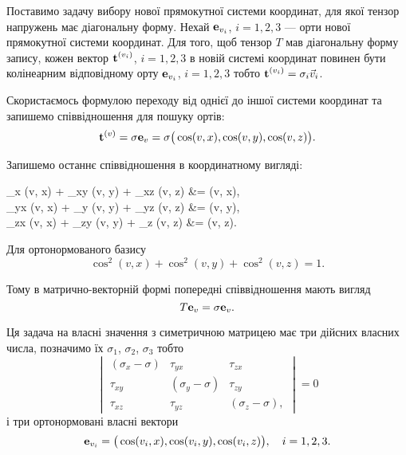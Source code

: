 Поставимо задачу вибору нової прямокутної системи координат, для якої тензор напружень має діагональну форму. Нехай $\bf{e}_{v_i}$, $i = 1, 2, 3$ --- орти нової прямокутної системи координат. Для того, щоб тензор $T$ мав діагональну форму запису, кожен вектор $\bf{t}^{(v_i)}$, $i = 1, 2, 3$ в новій системі координат повинен бути колінеарним відповідному орту $\bf{e}_{v_i}$, $i = 1, 2, 3$ тобто $\bf{t}^{(v_i)} = \sigma_i \vec v_i$. \medskip

Скористаємось формулою переходу від однієї до іншої системи координат та запишемо співвідношення для пошуку ортів:
\begin{equation}
	\bf{t}^{(v)} = \sigma \bf{e}_v = \sigma \big( \cos(v, x), \cos (v, y), \cos (v, z) \big).
\end{equation}

Запишемо останнє співвідношення в координатному вигляді:
\begin{system}
	\sigma_x \cos(v, x) + \tau_{xy} \cos(v, y) + \tau_{xz} \cos(v, z) &= \sigma \cos(v, x), \\
	\tau_{yx} \cos(v, x) + \sigma_y \cos(v, y) + \tau_{yz} \cos(v, z) &= \sigma \cos(v, y), \\
	\tau_{zx} \cos(v, x) + \tau_{zy} \cos(v, y) + \sigma_z \cos(v, z) &= \sigma \cos(v, z).
\end{system}

Для ортонормованого базису
\begin{equation}
	\cos^2(v, x) + \cos^2(v, y) + \cos^2(v, z) = 1.
\end{equation}

Тому в матрично-векторній формі попередні співвідношення мають вигляд
\begin{equation}
	T \bf{e}_v = \sigma \bf{e}_v.	
\end{equation}

Ця задача на власні значення з симетричною матрицею має три дійсних власних числа, позначимо їх $\sigma_1$, $\sigma_2$, $\sigma_3$ тобто 
\begin{equation}
	\begin{vmatrix}
		(\sigma_x - \sigma) & \tau_{y x} & \tau_{z x} \\
		\tau_{x y} & (\sigma_y - \sigma) & \tau_{z y} \\
		\tau_{x z} & \tau_{y z} & (\sigma_z - \sigma),
	\end{vmatrix} = 0
\end{equation}
і три ортонормовані власні вектори
\begin{equation}
	\bf{e}_{v_i} = \big( \cos(v_i, x), \cos(v_i, y), \cos(v_i, z) \big), \quad i = 1, 2, 3.
\end{equation}

